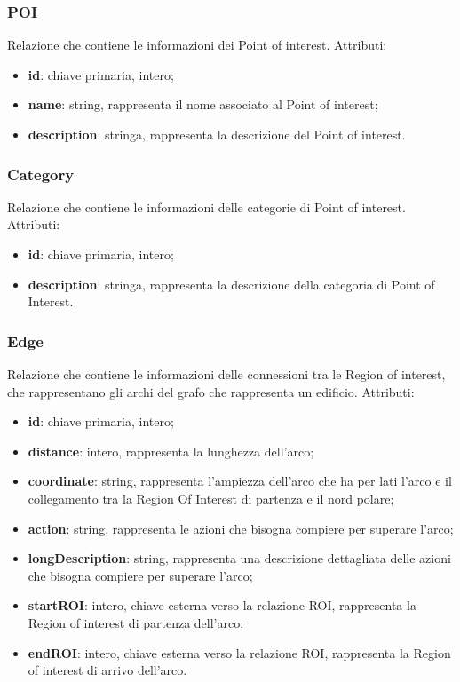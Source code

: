 \documentclass[../ManualeSviluppatore.tex]{subfiles}
\begin{document}
		\subsubsection{POI}
		Relazione che contiene le informazioni dei Point of interest. Attributi:
			\begin{itemize}
			\item \textbf{id}: chiave primaria, intero;
			\item \textbf{name}: string, rappresenta il nome associato al Point of interest;
			\item \textbf{description}: stringa, rappresenta la descrizione del Point of interest.
			\end{itemize}
		\subsubsection{Category}
		Relazione che contiene le informazioni delle categorie di Point of interest. Attributi:
			\begin{itemize}
			\item \textbf{id}: chiave primaria, intero;
			\item \textbf{description}: stringa, rappresenta la descrizione della categoria di Point of Interest.
			\end{itemize}
		\subsubsection{Edge}
		Relazione che contiene le informazioni delle connessioni tra le Region of interest, che rappresentano gli archi del grafo che rappresenta un edificio. Attributi:
			\begin{itemize}
			\item \textbf{id}: chiave primaria, intero;
			\item \textbf{distance}: intero, rappresenta la lunghezza dell'arco;
			\item \textbf{coordinate}: string, rappresenta l'ampiezza dell'arco che ha per lati l'arco e il collegamento tra la Region Of Interest di partenza e il nord polare; 
			\item \textbf{action}: string, rappresenta le azioni che bisogna compiere per superare l'arco;
			\item \textbf{longDescription}: string, rappresenta una descrizione dettagliata delle azioni che bisogna compiere per superare l'arco;
			\item \textbf{startROI}: intero, chiave esterna verso la relazione ROI, rappresenta la Region of interest di partenza dell'arco;
			\item \textbf{endROI}: intero, chiave esterna verso la relazione ROI, rappresenta la Region of interest di arrivo dell'arco.
			\end{itemize}
\end{document}
